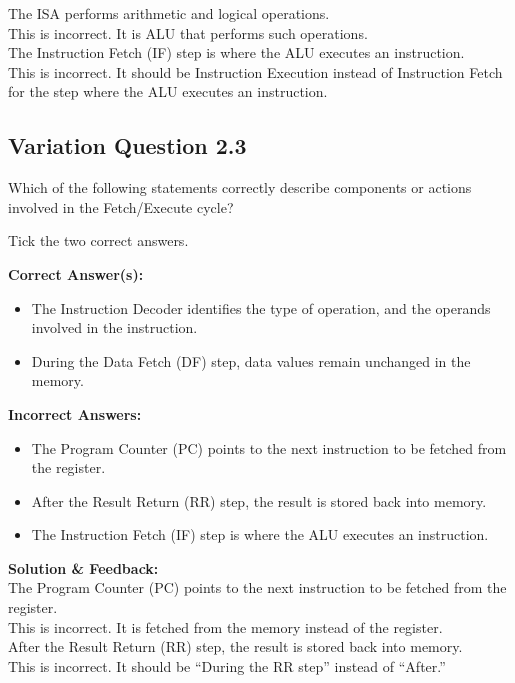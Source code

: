 The ISA performs arithmetic and logical operations.\\
This is incorrect. It is ALU that performs such operations.\\

The Instruction Fetch (IF) step is where the ALU executes an instruction.\\
This is incorrect. It should be Instruction Execution instead of Instruction Fetch for the step where the ALU executes an instruction.

\subsection{Variation Question 2.3}

Which of the following statements correctly describe components or actions involved in the Fetch/Execute cycle?

Tick the two correct answers.

\textbf{Correct Answer(s):}
\begin{itemize}
    \item The Instruction Decoder identifies the type of operation, and the operands involved in the instruction.
    \item During the Data Fetch (DF) step, data values remain unchanged in the memory.
\end{itemize}

\textbf{Incorrect Answers:}
\begin{itemize}
    \item The Program Counter (PC) points to the next instruction to be fetched from the register.
    \item After the Result Return (RR) step, the result is stored back into memory.
    \item The Instruction Fetch (IF) step is where the ALU executes an instruction.
\end{itemize}

\textbf{Solution \& Feedback:}\\
The Program Counter (PC) points to the next instruction to be fetched from the register.\\
This is incorrect. It is fetched from the memory instead of the register.\\

After the Result Return (RR) step, the result is stored back into memory.\\
This is incorrect. It should be ``During the RR step'' instead of ``After.''\\

